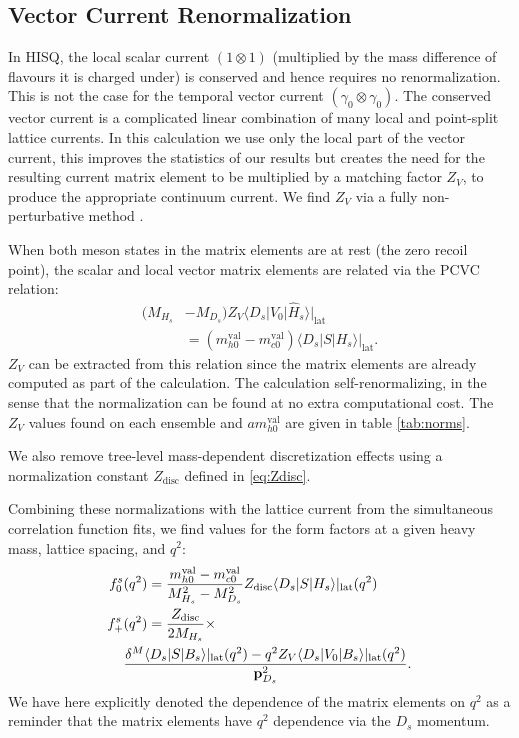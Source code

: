 \subsection{Vector Current Renormalization}

In HISQ, the local scalar current $(1\otimes 1)$ (multiplied by the mass difference of flavours it is charged under) is conserved and hence requires no renormalization. This is not the case for the temporal vector current $(\gamma_0\otimes \gamma_0)$. The conserved vector current is a complicated linear combination of many local and point-split lattice currents. In this calculation we use only the local part of the vector current, this improves the statistics of our results but creates the need for the resulting current matrix element to be multiplied by a matching factor $Z_V$, to produce the appropriate continuum current. We find $Z_V$ via a fully non-perturbative method \cite{McNeile:2011ng,Donald:2013pea}.

When both meson states in the matrix elements are at rest (the zero recoil point), the scalar and local vector matrix elements are related via the PCVC relation:
\begin{align}
  ( M_{H_s}& - M_{D_s} ) Z_V \langle D_s | V_0 | \hat{H}_s \rangle|_{\text{lat}} \nonumber \\ &= (m^{\text{val}}_{h0} - m^{\text{val}}_{c0}) \langle D_s | S | H_s \rangle|_{\text{lat}}.
  \label{eq:ward}
\end{align}
$Z_V$ can be extracted from this relation since the matrix elements are already computed as part of the calculation. The calculation self-renormalizing, in the sense that the normalization can be found at no extra computational cost. The $Z_V$ values found on each ensemble and $am^{\text{val}}_{h0}$ are given in table \ref{tab:norms}.

We also remove tree-level mass-dependent discretization effects using a normalization constant $Z_{\text{disc}}$ defined in \eqref{eq:Zdisc}.

Combining these normalizations with the lattice current from the simultaneous correlation function fits, we find values for the form factors at a given heavy mass, lattice spacing, and $q^2$:
\begin{align}
  \nonumber
  f_0^s&(q^2) = {m^{\text{val}}_{h0} - m^{\text{val}}_{c0}\over M_{H_s}^2 - M_{D_s}^2 } Z_{\text{disc}} \langle D_s | S | H_s \rangle|_{\text{lat}}(q^2) \\
  \label{eq:normalizations}
  f_+^s&(q^2) = {Z_{\text{disc}} \over 2M_{H_s}} \times \\ \nonumber &{ \delta^M \langle D_s | S | B_s \rangle|_{\text{lat}}(q^2) - q^2 Z_V \langle D_s | V_0 | B_s \rangle|_{\text{lat}}(q^2) \over {\bf{p}}^2_{D_s}}.
\end{align}
We have here explicitly denoted the dependence of the matrix elements on $q^2$ as a reminder that the matrix elements have $q^2$ dependence via the $D_s$ momentum.

